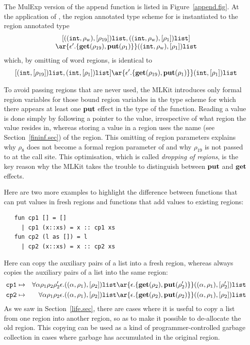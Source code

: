 \documentclass[12pt]{book}
\newcommand{\rhoword}{\rho_{\rm w}}
\begin{document}
The MulExp version of the append function is listed in
Figure~\ref{append.fig}. At the application of , the region
annotated type scheme for  is instantiated to the region annotated type
$$ \begin{array}{c}[ ((\boxml{int},\rhoword),[\rho_{19}])\boxml{list},
      ((\boxml{int},\rhoword),[\rho_1])\boxml{list} ]  \\
\ar{\epsilon'.\{\Get(\rho_{19}),\Put(\rho_1)\}} ((\boxml{int},\rhoword),[\rho_1])\boxml{list}
\end{array} $$
which, by omitting of word regions, is identical to
$$[ (\boxml{int},[\rho_{19}])\boxml{list},
      (\boxml{int},[\rho_1])\boxml{list} ]
\ar{\epsilon'.\{\Get(\rho_{19}),\Put(\rho_1)\}} (\boxml{int},[\rho_1])\boxml{list} $$

To avoid passing regions that are never used, the MLKit introduces only
formal region variables for those bound region variables in the type
scheme for which there appears at least one
%
$\mathop{\bf put}\nolimits$ effect in the type of the function.  Reading a value is done
simply by following a pointer to the value, irrespective of what
region the value resides in, whereas storing a value in a region uses
the name (see Section~\ref{fininf.sec}) of the region.  This omitting
of region parameters explains why $\rho_8$ does not become a formal
region parameter of  and why $\rho_{19}$ is not passed to
 at the call site. This optimisation, which is called
%
{\em dropping of regions}, is the key reason why the MLKit takes the
trouble to distinguish between $\mathop{\bf put}\nolimits$ and 
%
$\mathop{\bf get}\nolimits$ \label{bother-to-distinguish-get-n-put}effects.

Here are two more examples to highlight the difference between
functions that can put values in fresh regions and functions that add
values to existing regions:
\begin{verbatim}
   fun cp1 [] = []   
     | cp1 (x::xs) = x :: cp1 xs
   fun cp2 (l as []) = l
     | cp2 (x::xs) = x :: cp2 xs
\end{verbatim}
Here  can copy the auxiliary pairs of a list into a fresh
region, whereas  always copies the auxiliary pairs of a
list into the same region:
\begin{eqnarray*}
\boxml{cp1}&\mapsto&\forall\alpha\rho_1\rho_2\rho_2'\epsilon.
     ((\alpha,\rho_1),[\rho_2])\boxml{list} \ar{\epsilon.\{\Get(\rho_2),
           \Put(\rho_2')\}} ((\alpha,\rho_1),[\rho_2'])\boxml{list}\\
\boxml{cp2}&\mapsto&\forall\alpha\rho_1\rho_2\epsilon.
     ((\alpha,\rho_1),[\rho_2])\boxml{list} \ar{\epsilon.\{\Get(\rho_2),
           \Put(\rho_2)\}} ((\alpha,\rho_1),[\rho_2])\boxml{list}
\end{eqnarray*}
As we saw in Section~\ref{life.sec}, there are cases where it is
useful to copy a list from one region into another region, so as to
make it possible to de-allocate the old region. This copying can be
used as a kind of programmer-controlled garbage collection in cases
where garbage has accumulated in the original region.
\end{document}
